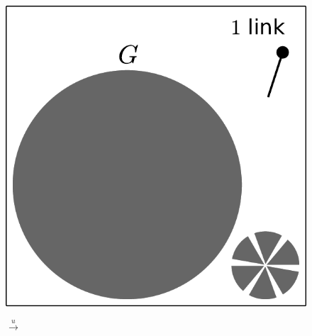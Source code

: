 \documentclass[aps, pre, onecolumn, a4paper, floatfix]{revtex4}
\begin{document}
\begin{figure}[htb]
  \begin{minipage}[b]{0.18\linewidth}
    \begin{center}
      \includegraphics[width=0.99\columnwidth]{sets_gc_all1.pdf}
   \end{center}
  \end{minipage}
  \begin{minipage}[b]{0.05\linewidth}
    \begin{center}
      {\Large $\xrightarrow{u}$}\\
      \vspace{15mm}
    \end{center}
  \end{minipage}
  \begin{minipage}[b]{0.18\linewidth}
    \begin{center}

\end{center}
\end{minipage}
\end{figure}
\end{document}
